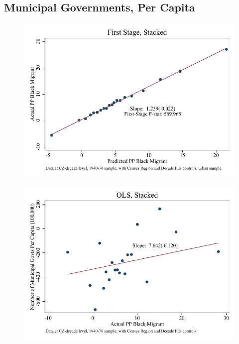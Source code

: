 \documentclass{article}
\begin{document}
\subsection{Municipal Governments, Per Capita}

\clearpage
\begin{figure}
\centering
\includegraphics{figures/simplefigs/stacked_gen_muni_pc_C3_urban_fs.pdf}
\end{figure}
\clearpage
\begin{figure}
\centering
\includegraphics{figures/simplefigs/stacked_gen_muni_pc_C3_urban_ols.pdf}
\end{figure}
\clearpage
\end{document}
